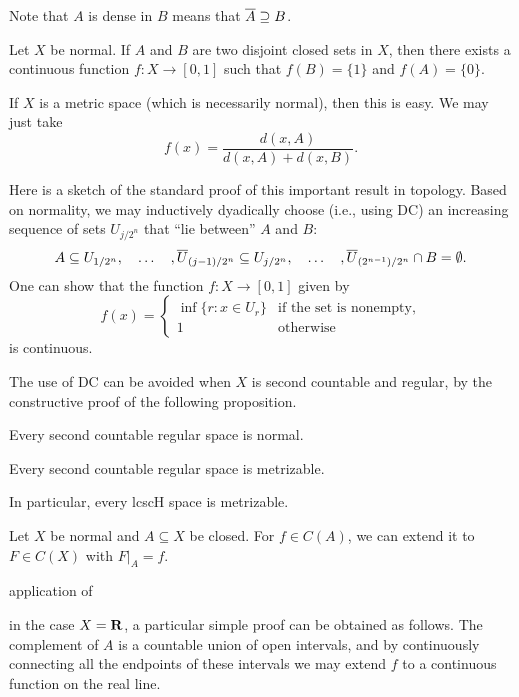 Note that $A$ is dense in $B$ means that $\overline{A} \supseteq B$.

\begin{namedthm} \label{thm:Urysohn}
    Let $X$ be normal. If $A$ and $B$ are two disjoint closed sets in $X$, then there exists a continuous function $f\colon X \to [0,1]$ such that $f(B) = \{1\}$ and $f(A)=\{0\}$.
\end{namedthm}

If $X$ is a metric space (which is necessarily normal), then this is easy. We may just take \[f(x) = \frac{d(x,A)}{d(x,A) + d(x,B)}.\]

Here is a sketch of the standard proof of this important result in topology. Based on normality, we may inductively dyadically choose (i.e., using \textsf{DC}) an increasing sequence of sets $U_{j/2^n}$ that ``lie between'' $A$ and $B$: \[
    A \subseteq U_{1/2^n},\quad \dotsc\quad ,\overline{U}_{(j-1)/2^n} \subseteq U_{j/2^n},\quad \dotsc\quad , \overline{U}_{(2^{n-1})/2^n} \cap B =\emptyset.
\]
One can show that the function $f\colon X\to [0,1]$ given by \[
    f(x) = \begin{cases}
        \inf\{r : x\in U_r\} & \text{if the set is nonempty}, \\
        1 & \text{otherwise}
    \end{cases}
\] is continuous.

The use of \textsf{DC} can be avoided when $X$ is second countable and regular, by the constructive proof of the following proposition.

\begin{prop}
    Every second countable regular space is normal.
\end{prop}

\begin{namedthm}
    Every second countable regular space is metrizable.
\end{namedthm}

In particular, every lcscH space is metrizable.

\cite[Theorem~4/16, Corollary~4.17]{folland1999}
\begin{namedthm}
    Let $X$ be normal and $A \subseteq X$ be closed. For $f \in C(A)$, we can extend it to $F \in C(X)$ with $F\vert_A = f$.
\end{namedthm}

application of 

in the case $X = \mathbf{R}$, a particular simple proof can be obtained as follows. The complement of $A$ is a countable union of open intervals, and by continuously connecting all the endpoints of these intervals we may extend $f$ to a continuous function on the real line.

